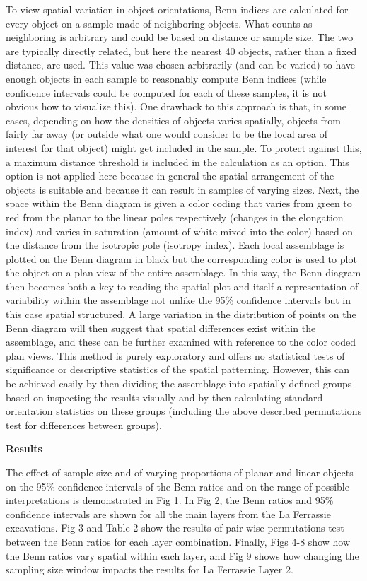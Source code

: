 \documentclass[]{article}
\begin{document}
To view spatial variation in object orientations, Benn indices are
calculated for every object on a sample made of neighboring objects.
What counts as neighboring is arbitrary and could be based on distance
or sample size. The two are typically directly related, but here the
nearest 40 objects, rather than a fixed distance, are used. This value
was chosen arbitrarily (and can be varied) to have enough objects in
each sample to reasonably compute Benn indices (while confidence
intervals could be computed for each of these samples, it is not obvious
how to visualize this). One drawback to this approach is that, in some
cases, depending on how the densities of objects varies spatially,
objects from fairly far away (or outside what one would consider to be
the local area of interest for that object) might get included in the
sample. To protect against this, a maximum distance threshold is
included in the calculation as an option. This option is not applied
here because in general the spatial arrangement of the objects is
suitable and because it can result in samples of varying sizes. Next,
the space within the Benn diagram is given a color coding that varies
from green to red from the planar to the linear poles respectively
(changes in the elongation index) and varies in saturation (amount of
white mixed into the color) based on the distance from the isotropic
pole (isotropy index). Each local assemblage is plotted on the Benn
diagram in black but the corresponding color is used to plot the object
on a plan view of the entire assemblage. In this way, the Benn diagram
then becomes both a key to reading the spatial plot and itself a
representation of variability within the assemblage not unlike the 95\%
confidence intervals but in this case spatial structured. A large
variation in the distribution of points on the Benn diagram will then
suggest that spatial differences exist within the assemblage, and these
can be further examined with reference to the color coded plan views.
This method is purely exploratory and offers no statistical tests of
significance or descriptive statistics of the spatial patterning.
However, this can be achieved easily by then dividing the assemblage
into spatially defined groups based on inspecting the results visually
and by then calculating standard orientation statistics on these groups
(including the above described permutations test for differences between
groups).

\textbf{Results}

The effect of sample size and of varying proportions of planar and
linear objects on the 95\% confidence intervals of the Benn ratios and
on the range of possible interpretations is demonstrated in Fig 1. In
Fig 2, the Benn ratios and 95\% confidence intervals are shown for all
the main layers from the La Ferrassie excavations. Fig 3 and Table 2
show the results of pair-wise permutations test between the Benn ratios
for each layer combination. Finally, Figs 4-8 show how the Benn ratios
vary spatial within each layer, and Fig 9 shows how changing the
sampling size window impacts the results for La Ferrassie Layer 2.
\end{document}
